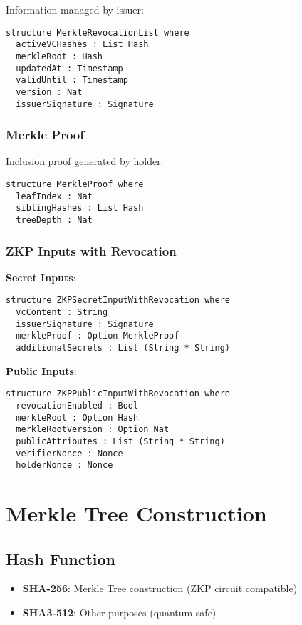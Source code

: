Information managed by issuer:

\begin{verbatim}
structure MerkleRevocationList where
  activeVCHashes : List Hash
  merkleRoot : Hash
  updatedAt : Timestamp
  validUntil : Timestamp
  version : Nat
  issuerSignature : Signature
\end{verbatim}

\subsubsection{Merkle Proof}

Inclusion proof generated by holder:

\begin{verbatim}
structure MerkleProof where
  leafIndex : Nat
  siblingHashes : List Hash
  treeDepth : Nat
\end{verbatim}

\subsubsection{ZKP Inputs with Revocation}

\textbf{Secret Inputs}:

\begin{verbatim}
structure ZKPSecretInputWithRevocation where
  vcContent : String
  issuerSignature : Signature
  merkleProof : Option MerkleProof
  additionalSecrets : List (String * String)
\end{verbatim}

\textbf{Public Inputs}:

\begin{verbatim}
structure ZKPPublicInputWithRevocation where
  revocationEnabled : Bool
  merkleRoot : Option Hash
  merkleRootVersion : Option Nat
  publicAttributes : List (String * String)
  verifierNonce : Nonce
  holderNonce : Nonce
\end{verbatim}

\section{Merkle Tree Construction}

\subsection{Hash Function}

\begin{itemize}
  \item \textbf{SHA-256}: Merkle Tree construction (ZKP circuit compatible)
  \item \textbf{SHA3-512}: Other purposes (quantum safe)
\end{itemize}

